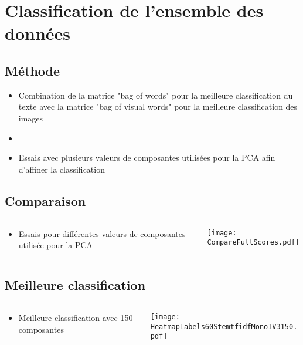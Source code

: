 \documentclass[8pt,aspectratio=169,hyperref={unicode=true}]{beamer}
\begin{document}
\section{Classification de l'ensemble des données}

\subsection{Méthode}
\begin{frame}{\insertsubsection}
\begin{itemize}
    \item Combination de la matrice "bag of words" pour la meilleure classification du texte avec la matrice "bag of visual words" pour la meilleure classification des images
    \item[]
    \item Essais avec plusieurs valeurs de composantes utilisées pour la PCA afin d'affiner la classification
\end{itemize}
\end{frame}

\subsection{Comparaison}
\begin{frame}{\insertsubsection}
    \begin{columns}
        \begin{column}{.4\textwidth}
            \begin{itemize}
                \item Essais pour différentes valeurs de composantes utilisée pour la PCA
            \end{itemize}
        \end{column}
        \begin{column}{.6\textwidth}
            \texttt{[image: CompareFullScores.pdf]}
        \end{column}
    \end{columns}
\end{frame}

\subsection{Meilleure classification}
\begin{frame}{\insertsubsection}
    \begin{columns}
        \begin{column}{.4\textwidth}
            \begin{itemize}
                \item Meilleure classification avec 150 composantes
            \end{itemize}
        \end{column}
        \begin{column}{.6\textwidth}
            \texttt{[image: HeatmapLabels60StemtfidfMonoIV3150.pdf]}
        \end{column}
    \end{columns}
\end{frame}
\end{document}
